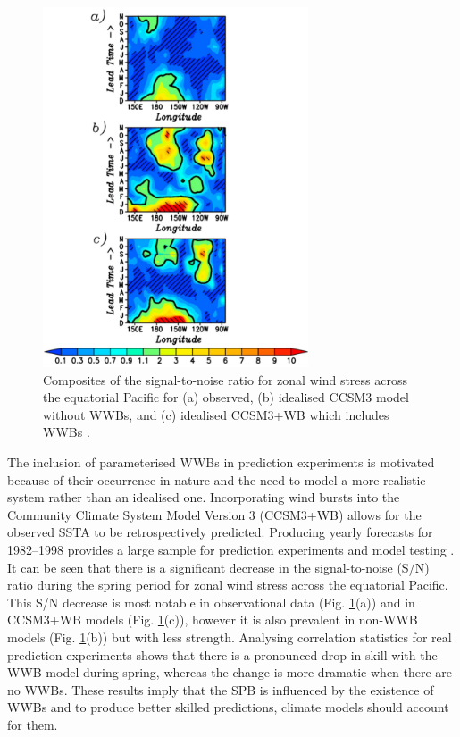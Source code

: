 \documentclass[12pt, onecolumn]{revtex4}    %
\begin{document}
\begin{figure}
\includegraphics[width=0.7\textwidth]{data/wwbs}
\caption[WWBs]{Composites of the signal-to-noise ratio for zonal wind stress across the equatorial Pacific for (a) observed, (b) idealised CCSM3 model without WWBs, and (c) idealised CCSM3+WB which includes WWBs \citep{lopez2014wwbs}.}
\label{fig:wwbs}
\end{figure}

The inclusion of parameterised WWBs in prediction experiments is motivated because of their occurrence in nature and the need to model a more realistic system rather than an idealised one. Incorporating wind bursts into the Community Climate System Model Version 3 \citep{collins2006community} (CCSM3+WB) allows for the observed SSTA to be retrospectively predicted. Producing yearly forecasts for 1982--1998 provides a large sample for prediction experiments and model testing \citep{lopez2014wwbs}. It can be seen that there is a significant decrease in the signal-to-noise (S/N) ratio during the spring period for zonal wind stress across the equatorial Pacific. This S/N decrease is most notable in observational data (Fig. \ref{fig:wwbs}(a)) and in CCSM3+WB models (Fig. \ref{fig:wwbs}(c)), however it is also prevalent in non-WWB models (Fig. \ref{fig:wwbs}(b)) but with less strength. Analysing correlation statistics for real prediction experiments shows that there is a pronounced drop in skill with the WWB model during spring, whereas the change is more dramatic when there are no WWBs. These results imply that the SPB is influenced by the existence of WWBs and to produce better skilled predictions, climate models should account for them.
\end{document}
